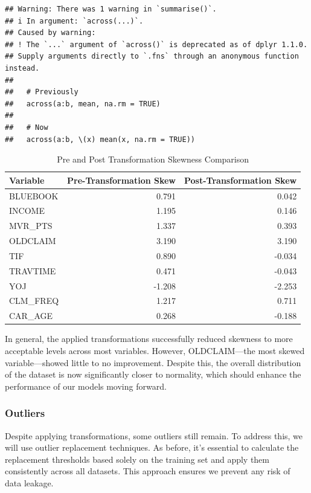 \documentclass[
]{article}
\begin{document}
\begin{verbatim}
## Warning: There was 1 warning in `summarise()`.
## i In argument: `across(...)`.
## Caused by warning:
## ! The `...` argument of `across()` is deprecated as of dplyr 1.1.0.
## Supply arguments directly to `.fns` through an anonymous function instead.
## 
##   # Previously
##   across(a:b, mean, na.rm = TRUE)
## 
##   # Now
##   across(a:b, \(x) mean(x, na.rm = TRUE))
\end{verbatim}

\begin{table}[H]
\centering\centering
\caption{\label{tab:skew before and after}Pre and Post Transformation Skewness Comparison}
\centering
\begin{tabular}[t]{l|r|r}
\hline
Variable & Pre-Transformation Skew & Post-Transformation Skew\\
\hline
BLUEBOOK & 0.791 & 0.042\\
\hline
INCOME & 1.195 & 0.146\\
\hline
MVR\_PTS & 1.337 & 0.393\\
\hline
OLDCLAIM & 3.190 & 3.190\\
\hline
TIF & 0.890 & -0.034\\
\hline
TRAVTIME & 0.471 & -0.043\\
\hline
YOJ & -1.208 & -2.253\\
\hline
CLM\_FREQ & 1.217 & 0.711\\
\hline
CAR\_AGE & 0.268 & -0.188\\
\hline
\end{tabular}
\end{table}

In general, the applied transformations successfully reduced skewness to
more acceptable levels across most variables. However, OLDCLAIM---the
most skewed variable---showed little to no improvement. Despite this,
the overall distribution of the dataset is now significantly closer to
normality, which should enhance the performance of our models moving
forward.

\subsubsection{Outliers}\label{outliers}

Despite applying transformations, some outliers still remain. To address
this, we will use outlier replacement techniques. As before, it's
essential to calculate the replacement thresholds based solely on the
training set and apply them consistently across all datasets. This
approach ensures we prevent any risk of data leakage.
\end{document}
